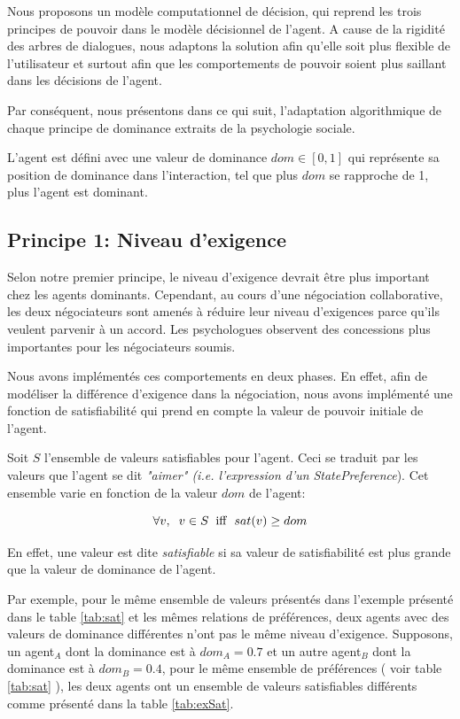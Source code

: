 	Nous proposons un modèle computationnel de décision, qui reprend les trois principes de pouvoir dans le modèle décisionnel de l'agent. 
	A cause de la rigidité des arbres de dialogues, nous adaptons la solution afin qu'elle soit plus flexible de l'utilisateur et surtout afin que les comportements de pouvoir soient plus saillant dans les décisions de l'agent.
	
	Par conséquent, nous présentons dans ce qui suit, l'adaptation algorithmique de chaque principe de dominance extraits de la psychologie sociale.
	
	L'agent est défini avec une valeur de dominance $dom \in [0,1]$ qui représente sa position de dominance dans l'interaction, tel que plus $dom$ se rapproche de 1, plus l'agent est dominant. 
	
	\subsection{Principe 1: Niveau d'exigence}
	
	Selon notre premier principe, le niveau d'exigence devrait être plus important chez les agents dominants. Cependant, au cours d'une négociation collaborative, les deux négociateurs sont amenés à réduire leur niveau d'exigences parce qu'ils veulent parvenir à un accord. Les psychologues observent des concessions plus importantes pour les négociateurs soumis. 
	
	Nous avons implémentés ces comportements en deux phases. En effet, afin de modéliser la différence d'exigence dans la négociation, nous avons implémenté une fonction de satisfiabilité qui prend en compte la valeur de pouvoir initiale de l'agent. 
	
	Soit $S$ l'ensemble de valeurs satisfiables pour l'agent. Ceci se traduit par les valeurs que l'agent se dit \textit{"aimer" (i.e. l'expression d'un } \emph{StatePreference}). Cet ensemble varie en fonction de la valeur $dom$ de l'agent:
	
	\begin{equation}
	\forall v,\hspace{2mm} v\in S\hspace{2mm}\mathrm{iff}\hspace{2mm}sat(v) \geq dom
	\end{equation}
	
	En effet, une valeur est dite \textit{satisfiable} si sa valeur de satisfiabilité est plus grande que la valeur de dominance de l'agent.
	
	Par exemple, pour le même ensemble de valeurs présentés dans l'exemple présenté dans le table \ref{tab:sat} et les mêmes relations de préférences, deux agents avec des valeurs de dominance différentes n'ont pas le même niveau d'exigence. Supposons, un agent$_A$ dont la dominance est à $dom_A=0.7$ et un autre agent$_B$ dont la dominance est à $dom_B=0.4$, pour le même ensemble de préférences ( voir table \ref{tab:sat} ), les deux agents ont un ensemble de valeurs satisfiables différents comme présenté dans la table \ref{tab:exSat}.
	
